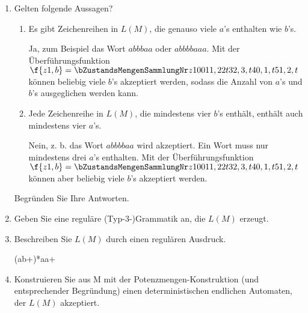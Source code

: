 \documentclass{bschlangaul-aufgabe}
\begin{document}
\begin{enumerate}


\item Gelten folgende Aussagen?

\begin{enumerate}


\item Es gibt Zeichenreihen in $L(M)$, die genauso viele $a$’s enthalten
wie $b$’s.

\begin{liAntwort}
Ja, zum Beispiel das Wort $abbbaa$ oder $abbbbaaa$. Mit der
Überführungsfunktion $\f{z1, b} = \z{ z1 }$ können beliebig viele $b$’s
akzeptiert werden, sodass die Anzahl von $a$’s und $b$’s ausgeglichen
werden kann.
\end{liAntwort}


\item Jede Zeichenreihe in $L(M)$, die mindestens vier $b$’s enthält,
enthält auch mindestens vier $a$’s.

\begin{liAntwort}
Nein, z. b. das Wort $abbbbaa$ wird akzeptiert. Ein Wort muss nur
mindestens drei $a$’s enthalten. Mit der Überführungsfunktion $\f{z1, b}
= \z{ z1 }$ können aber beliebig viele $b$’s akzeptiert werden.
\end{liAntwort}

\end{enumerate}

Begründen Sie Ihre Antworten.


\item Geben Sie eine reguläre (Typ-3-)Grammatik an, die $L(M)$ erzeugt.


\item Beschreiben Sie $L(M)$ durch einen regulären Ausdruck.

\begin{liAntwort}
(ab+)*aa+
\end{liAntwort}


\item Konstruieren Sie aus M mit der Potenzmengen-Konstruktion (und
entsprechender Begründung) einen deterministischen endlichen Automaten,
der $L(M)$ akzeptiert.


\end{enumerate}
\end{document}
